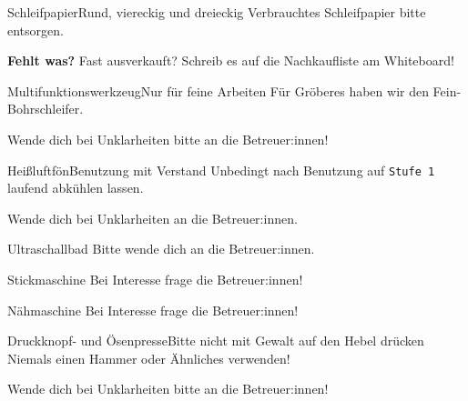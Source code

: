 \begin{schild}[farbe=gruen, modell=für ROTEX und RUTSCHER, einweisung=werkstatt-einweisung]
	{Schleifpapier}{Rund, viereckig und dreieckig}
Verbrauchtes Schleifpapier bitte entsorgen.

\textbf{Fehlt was?} Fast ausverkauft? Schreib es auf die Nachkaufliste am Whiteboard!
\end{schild}

\begin{schild}[farbe=gruen, modell=Dremel 3000, seite=dremel]
	{Multifunktionswerkzeug}{Nur für feine Arbeiten}
Für Gröberes haben wir den Fein-Bohrschleifer.

Wende dich bei Unklarheiten bitte an die Betreuer:innen!
\end{schild}

\begin{schild}[farbe=gruen, symbole={W017}]
	{Heißluftfön}{Benutzung mit Verstand}
Unbedingt nach Benutzung auf \texttt{Stufe 1} laufend abkühlen lassen.

Wende dich bei Unklarheiten an die Betreuer:innen.
\end{schild}

\begin{schild}[farbe=gelb, einweisung=ultraschallbad-einweisung,
	kontakt={FabLab-Aktive, \mail{technik@fablab.fau.de}}]
	{Ultraschallbad}{}
Bitte wende dich an die Betreuer:innen.
\end{schild}

\begin{schild}[farbe=gelb, modell=Brother VR, einweisung=stickmaschine-einweisung]
	{Stickmaschine}{}
Bei Interesse frage die Betreuer:innen!
\end{schild}

\begin{schild}[farbe=gelb, modell=Pfaff 260, einweisung=naehmaschine-einweisung]
	{Nähmaschine}{}
Bei Interesse frage die Betreuer:innen!
\end{schild}

\begin{schild}[farbe=gruen, seite=oesen-und-druckknopfpresse]
	{Druckknopf- und Ösenpresse}{Bitte nicht mit Gewalt auf den Hebel drücken}
Niemals einen Hammer oder Ähnliches verwenden!

Wende dich bei Unklarheiten bitte an die Betreuer:innen!
\end{schild}

